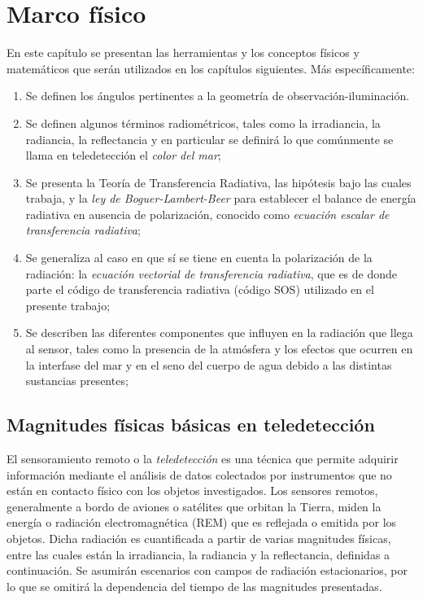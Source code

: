 \chapter{Marco físico}
\label{ch:marcofisico}

En este capítulo se presentan las herramientas y los conceptos
físicos y matemáticos que serán utilizados en los capítulos siguientes. Más específicamente:
\begin{enumerate}
\item Se definen los ángulos pertinentes a la geometría de observación-iluminación.
\item Se definen algunos términos radiométricos, tales como la irradiancia,
la radiancia, la reflectancia y en particular se definirá lo que comúnmente se llama
en teledetección el \textit{color del mar};
\item Se presenta la Teoría de Transferencia Radiativa, las hipótesis bajo las cuales trabaja, y
la \textit{ley de Boguer-Lambert-Beer} para establecer el balance de energía radiativa en ausencia de polarización, conocido como \textit{ecuación escalar de transferencia radiativa};
\item Se generaliza al caso en que sí se tiene en cuenta la polarización de la radiación: la
\textit{ecuación vectorial de transferencia radiativa}, que es de donde parte el código de
transferencia radiativa (código SOS) utilizado en el presente trabajo;
\item Se describen las diferentes componentes que influyen en la radiación que llega
al sensor, tales como la presencia de la atmósfera y los efectos que ocurren en
la interfase del mar y en el seno del cuerpo de agua debido a las distintas sustancias presentes;
\end{enumerate}

\section{Magnitudes físicas básicas en teledetección}
\label{ch:marcofisico:magnitudes}
El sensoramiento remoto o la \textit{teledetección} es una técnica que permite adquirir
información mediante el análisis de datos colectados por instrumentos que no
están en contacto físico con los objetos investigados. Los sensores remotos,
generalmente a bordo de aviones o satélites que orbitan la Tierra, miden la energía
o radiación electromagnética (REM) que es reflejada o emitida por los objetos. Dicha radiación
es cuantificada a partir de varias magnitudes físicas, entre las cuales
están la irradiancia, la radiancia y la reflectancia, definidas a continuación. Se asumirán
escenarios con campos de radiación estacionarios, por lo que se omitirá la dependencia del tiempo de las
magnitudes presentadas.

